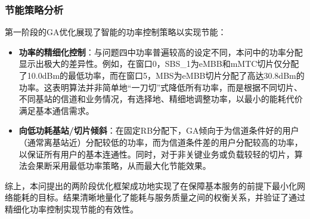\subsubsection{节能策略分析}
第一阶段的GA优化展现了智能的功率控制策略以实现节能：
\begin{itemize}
    \item \textbf{功率的精细化控制}：与问题四中功率普遍较高的设定不同，本问中的功率分配显示出极大的差异性。例如，在窗口0，SBS\_1为eMBB和mMTC切片仅分配了10.0dBm的最低功率，而在窗口5，MBS为eMBB切片分配了高达30.8dBm的功率。这表明算法并非简单地“一刀切”式降低所有功率，而是根据不同切片、不同基站的信道和业务情况，有选择地、精细地调整功率，以最小的能耗代价满足基本通信需求。
    \item \textbf{向低功耗基站/切片倾斜}：在固定RB分配下，GA倾向于为信道条件好的用户（通常离基站近）分配较低的功率，而为信道条件差的用户分配较高的功率，以保证所有用户的基本连通性。同时，对于非关键业务或负载较轻的切片，算法会果断采用最低功率策略，从而最大化节能效果。
\end{itemize}

综上，本问提出的两阶段优化框架成功地实现了在保障基本服务的前提下最小化网络能耗的目标。结果清晰地量化了能耗与服务质量之间的权衡关系，并验证了通过精细化功率控制实现节能的有效性。

